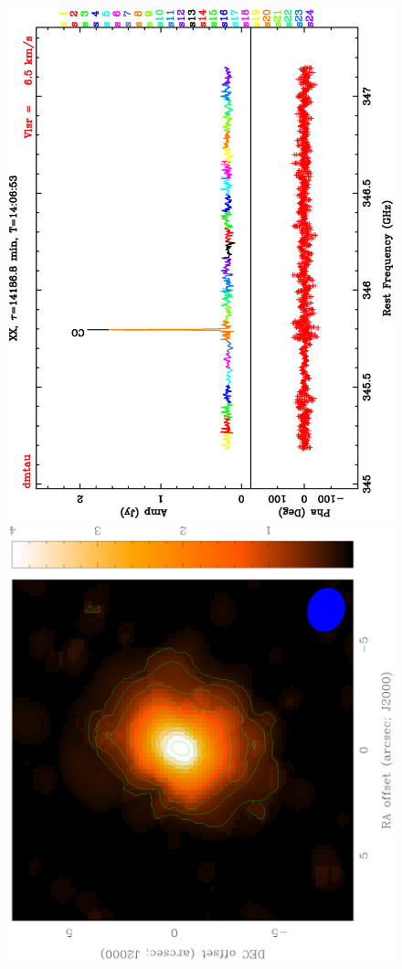 \begin{figure}
\begin{minipage}{20pc}
\end{minipage}
\vspace{0pc}
\begin{minipage}{20pc}
\centering
\includegraphics[height=0.155\textheight,angle=-90]{part7/Zhao_P36/f2b.ps}
\includegraphics[height=0.137\textheight,angle=-90]{part7/Zhao_P36/f2d.ps}

\end{minipage}
\end{figure}
